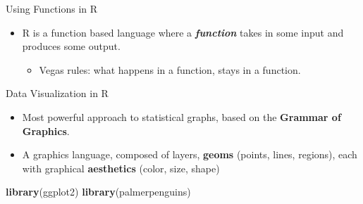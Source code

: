 \documentclass[
  ignorenonframetext,
]{beamer}
\newenvironment{Shaded}{\begin{snugshade}}{\end{snugshade}}
\newcommand{\FunctionTok}[1]{\textcolor[rgb]{0.13,0.29,0.53}{\textbf{#1}}}
\newcommand{\NormalTok}[1]{#1}
\providecommand{\tightlist}{%
  \setlength{\itemsep}{0pt}\setlength{\parskip}{0pt}}
\begin{document}
\begin{frame}{Using Functions in R}
\label{using-functions-in-r}
\begin{itemize}
\tightlist
\item
  R is a function based language where a \textbf{\emph{function}} takes
  in some input and produces some output.

  \begin{itemize}
  \tightlist
  \item
    Vegas rules: what happens in a function, stays in a function.
  \end{itemize}
\end{itemize}
\end{frame}

\begin{frame}[fragile]{Data Visualization in R}
\label{data-visualization-in-r}
\begin{itemize}
\tightlist
\item
  Most powerful approach to statistical graphs, based on the
  \textbf{Grammar of Graphics}.
\end{itemize}

\begin{itemize}
\tightlist
\item
  A graphics language, composed of layers, \textbf{geoms} (points,
  lines, regions), each with graphical \textbf{aesthetics} (color, size,
  shape)
\end{itemize}

\begin{Shaded}
\begin{Highlighting}[]
\FunctionTok{library}\NormalTok{(ggplot2)}
\FunctionTok{library}\NormalTok{(palmerpenguins)}
\end{Highlighting}
\end{Shaded}
\end{frame}
\end{document}
